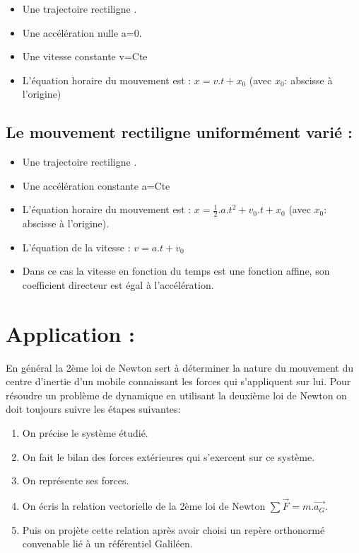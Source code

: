 \documentclass[12pt]{article}
\begin{document}
\begin{itemize}
	\item Une trajectoire rectiligne .
	\item Une accélération nulle a=0.
	\item Une vitesse constante v=Cte
	\item L'équation horaire du mouvement est : $x = v.t+x_0$ (avec $x_0$: abscisse à l'origine)

\end{itemize}

\subsection{Le mouvement rectiligne uniformément varié : }

\begin{itemize}
	\item Une trajectoire rectiligne .
	\item  Une accélération constante a=Cte
	\item L'équation horaire du mouvement est : $x = \frac{1}{2}.a.t^2 + v_0.t+ x_0$ (avec $ x_0$: abscisse à l'origine).
	\item L'équation de la vitesse : $v = a.t + v_0$
	\item Dans ce cas la vitesse en fonction du temps est une fonction affine, son coefficient directeur est égal à l'accélération.
\end{itemize}


\section{Application :}
En général la 2ème loi de Newton sert à déterminer la nature du mouvement du centre d'inertie d'un mobile connaissant les
forces qui s'appliquent sur lui.
Pour résoudre un problème de dynamique en utilisant la deuxième loi de Newton on doit toujours suivre les étapes suivantes:
\begin{enumerate}
	\item  On précise le système étudié.
	\item  On fait le bilan des forces extérieures qui s'exercent sur ce système.
\item  On représente ses forces.
\item  On écris la relation vectorielle de la 2ème loi de Newton $\sum \vec{F} = m.\vec{a_G}$.

\item  Puis on projète cette relation après avoir choisi un repère orthonormé convenable lié à un référentiel Galiléen.
\end{enumerate}
\end{document}
